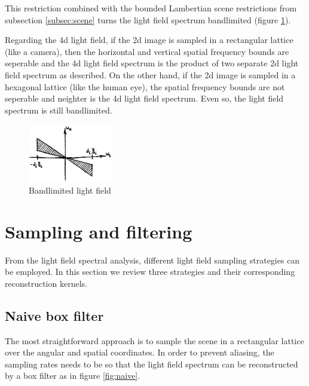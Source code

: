 \documentclass[acmtog,review,anonymous]{acmart}
\begin{document}
This restriction combined with the bounded Lambertian scene restrictions from subsection \ref{subsec:scene} turns the light field spectrum bandlimited (figure \ref{fig:bandlimited}).

Regarding the 4d light field, if the 2d image is sampled in a rectangular lattice (like a camera), then the horizontal and vertical spatial frequency bounds are seperable and the 4d light field spectrum is the product of two separate 2d light field spectrum as described. On the other hand, if the 2d image is sampled in a hexagonal lattice (like the human eye), the spatial frequency bounds are not seperable and neighter is the 4d light field spectrum. Even so, the light field spectrum is still bandlimited.

\begin{figure}[h]
  \includegraphics[height=1in]{figures/bandlimited}
  \caption{Bandlimited light field}
  \label{fig:bandlimited}
\end{figure}

\section{Sampling and filtering}

From the light field spectral analysis, different light field sampling strategies can be employed. In this section we review three strategies and their corresponding reconstruction kernels.

\subsection{Naive box filter}

The most straightforward approach is to sample the scene in a rectangular lattice over the angular and spatial coordinates. In order to prevent aliasing, the sampling rates needs to be so that the light field spectrum can be reconstructed by a box filter as in figure \ref{fig:naive}.
\end{document}
